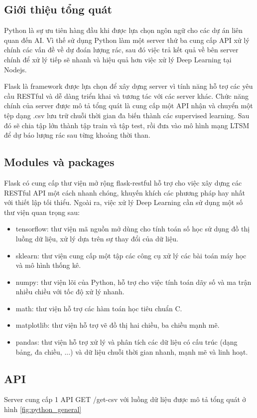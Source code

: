 \subsection{Giới thiệu tổng quát}
Python là sự ưu tiên hàng đầu khi được lựa chọn ngôn ngữ cho các dự án liên quan đến AI. Vì thế sử dụng Python làm một server thứ ba cung cấp API xử lý chính các vấn đề về dự đoán lượng rác, sau đó việc trả kết quả về bên server chính để xử lý tiếp sẽ nhanh và hiệu quả hơn việc xử lý Deep Learning tại Nodejs.

Flask là framework được lựa chọn để xây dựng server vì tính năng hỗ trợ các yêu cầu RESTful và dễ dàng triển khai và tương tác với các server khác. Chức năng chính của server được mô tả tổng quát là cung cấp một API nhận và chuyển một tệp dạng .csv lưu trữ chuỗi thời gian đa biến thành các supervised learning. Sau đó sẽ chia tập lớn thành tập train và tập test, rồi đưa vào mô hình mạng LTSM để dự báo lượng rác sau từng khoảng thời than. 

\subsection{Modules và packages}
Flask có cung cấp thư viện mở rộng flask-restful hỗ trợ cho việc xây dựng các RESTful API một cách nhanh chóng, khuyến khích các phương pháp hay nhất với thiết lập tối thiểu. Ngoài ra, việc xử lý Deep Learning cần sử dụng một số thư viện quan trọng sau:

\begin{itemize}
    \item tensorflow: thư viện mã nguồn mở dùng cho tính toán số học sử dụng đồ thị luồng dữ liệu, xử lý dựa trên sự thay đổi của dữ liệu.
    \item sklearn: thư viện cung cấp một tập các công cụ xử lý các bài toán máy học và mô hình thống kê.
    \item numpy: thư viện lõi của Python, hỗ trợ cho việc tính toán dãy số và ma trận nhiều chiều với tốc độ xử lý nhanh.
    \item math: thư viện hỗ trợ các hàm toán học tiêu chuẩn C.
    \item matplotlib: thư viện hỗ trợ vẽ đồ thị hai chiều, ba chiều mạnh mẽ.
    \item pandas: thư viện hỗ trợ xử lý và phân tích các dữ liệu có cấu trúc (dạng bảng, đa chiều, ...) và dữ liệu chuỗi thời gian nhanh, mạnh mẽ và linh hoạt.
\end{itemize}

\subsection{API}
Server cung cấp 1 API GET /get-csv với luồng dữ liệu được mô tả tổng quát ở hình \ref{fig:python_general}

